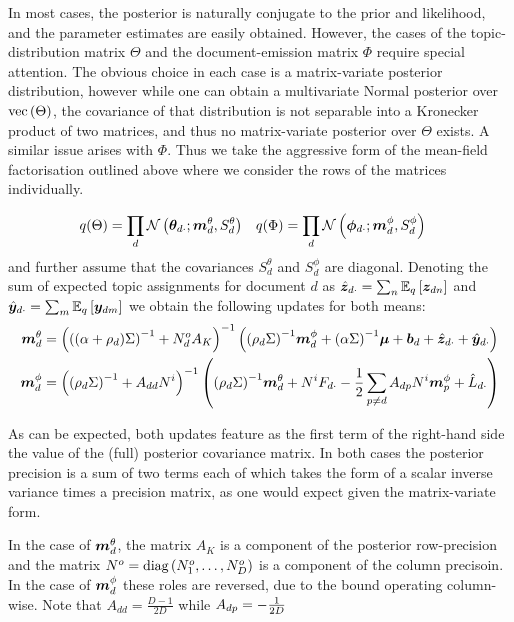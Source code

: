 In most cases, the posterior is naturally conjugate to the prior and likelihood, and the parameter estimates are easily obtained. However, the cases of the topic-distribution matrix $\Theta$ and the document-emission matrix $\Phi$ require special attention. The obvious choice in each case is a matrix-variate posterior distribution, however while one can obtain a multivariate Normal posterior over $\vecf{\Theta}$, the covariance of that distribution is not separable into a Kronecker product of two matrices, and thus no matrix-variate posterior over $\Theta$ exists. A similar issue arises with $\Phi$. Thus we take the aggressive form of the mean-field factorisation outlined above where we consider the rows of the matrices individually.

\newcommand \mtd { { \vv{m}^{\theta}_d } }
\newcommand \std { { S^\theta_d } }
\newcommand \mpd { { \vv{m}^{\phi}_d } }
\newcommand \spd { { S^\phi_d } }

\begin{align}
q(\Theta) &= \prod_d \mathcal{N}\left(\thdo; \mtd, \std \right) &
q(\Phi) &= \prod_d \mathcal{N}\left(\phdo; \mpd, \spd\right) 
\end{align}
and further assume that the covariances $\std$ and $\spd$ are diagonal. Denoting the sum of expected topic assignments for document $d$ as $\hat{\vv{z}}_{d\cdot} = \sum_n \ex{\vv{z}_{dn}}{q}$ and $\hat{\vv{y}}_{d\cdot} = \sum_m \ex{\vv{y}_{dm}}{q}$ we obtain the following updates for both means:
\begin{align}
\mtd &= \invb{ \invb{(\alpha + \rho_d)\Sigma} + N^o_d A_K }
            \left(
                \invb{\rho_d \Sigma} \mpd
                + \invb{\alpha \Sigma}\vv{\mu}
                + \vv{b}_d 
                + \hat{\vv{z}}_{d\cdot}
                + \hat{\vv{y}}_{d\cdot}
            \right) \\
 \mpd & = \invb{\invb{\rho_d \Sigma} + A_{dd}N^i}
             \left(
                 \invb{\rho_d \Sigma}\mtd + N^i F_{d\cdot} -\half \sum_{p \neq d} A_{dp} N^i \vv{m}^\phi_p + \hat{L}_{d\cdot}
             \right)
 \end{align}
 
As can be expected, both updates feature as the first term of the right-hand side the value of the (full) posterior covariance matrix. In both cases the posterior precision is a sum of two terms each of which takes the form of a scalar inverse variance times a precision matrix, as one would expect given the matrix-variate form. 

In the case of $\mtd$, the matrix $A_K$ is a component of the posterior row-precision and the matrix $N^o = \diag{N^o_1, \ldots, N^o_D}$ is a component of the column precisoin. In the case of $\mpd$ these roles are reversed, due to the bound operating column-wise. Note that $A_{dd} = \frac{D-1}{2D}$ while $A_{dp} = - \oneover{2D}$

